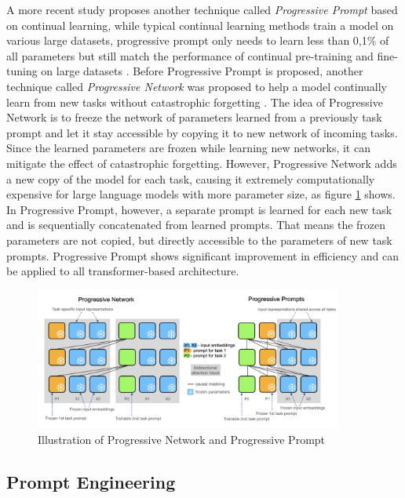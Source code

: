 \documentclass[runningheads]{llncs}
\begin{document}
\noindent \newline
A more recent study proposes another technique called \textit{Progressive Prompt} based on continual learning, while typical continual learning methods train a model on various large datasets, progressive prompt only needs
to learn less than 0,1\% of all parameters but still match the performance of continual pre-training and fine-tuning on large datasets \cite{Razda23}. Before Progressive Prompt is proposed, another technique called \textit{Progressive Network}
was proposed to help a model continually learn from new tasks without catastrophic forgetting \cite{Rusu16}. The idea of Progressive Network is to freeze the network of parameters learned from a previously task prompt and let it stay accessible by copying it to new
network of incoming tasks. Since the learned parameters are frozen while learning new networks, it can mitigate the effect of catastrophic forgetting. However, Progressive Network adds a new copy of the model for each task, causing it extremely 
computationally expensive for large language models with more parameter size, as figure \ref{fig:progressive} shows. In Progressive Prompt, however, a separate prompt is learned for each new task and is sequentially concatenated from learned prompts.
That means the frozen parameters are not copied, but directly accessible to the parameters of new task prompts. Progressive Prompt shows significant improvement in efficiency and can be applied to all transformer-based architecture.
\begin{figure}[H]
  \centering
  \includegraphics[width=0.9\textwidth]{progressive.png}
  \caption{Illustration of Progressive Network and Progressive Prompt \cite{Razda23}}
  \label{fig:progressive}
\end{figure}

\subsection{Prompt Engineering}
\end{document}
